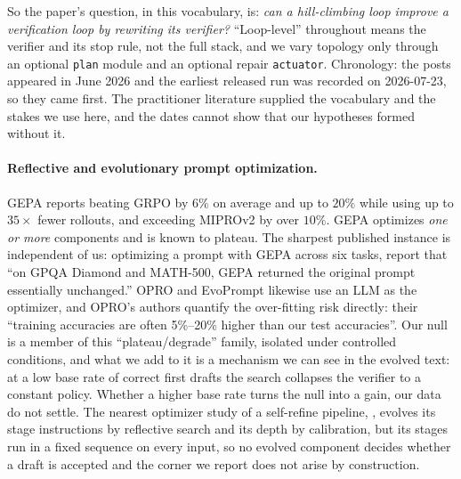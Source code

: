 \documentclass[11pt]{article}
\begin{document}
So the paper's question, in this vocabulary, is: \emph{can a hill-climbing loop improve a
verification loop by rewriting its verifier?} ``Loop-level'' throughout means the verifier
and its stop rule, not the full stack, and we vary topology only through an optional
\texttt{plan} module and an optional repair \texttt{actuator}. Chronology: the posts appeared
in June 2026 and the earliest released run was recorded on 2026-07-23, so they came first. The
practitioner literature supplied the vocabulary and the stakes we use here, and the dates cannot
show that our hypotheses formed without it.

\paragraph{Reflective and evolutionary prompt optimization.}
GEPA \citep{agrawal2025gepa} reports beating GRPO by $6\%$ on average and up to $20\%$ while
using up to $35\times$ fewer rollouts, and exceeding MIPROv2 by over $10\%$. GEPA
optimizes \emph{one or more} components and is known to plateau. The sharpest published
instance is independent of us: optimizing a prompt with GEPA across six tasks,
\citet{pappu2026multiagent} report that ``on GPQA Diamond and MATH-500, GEPA returned the
original prompt essentially unchanged.'' OPRO \citep{yang2023opro} and EvoPrompt
\citep{guo2024evoprompt} likewise use an
LLM as the optimizer, and OPRO's authors quantify the over-fitting risk directly: their
``training accuracies are often 5\%--20\% higher than our test accuracies''. Our null is a
member of this ``plateau/degrade'' family, isolated under controlled conditions, and what we add
to it is a mechanism we can see in the evolved text: at a low base rate of correct first drafts
the search collapses the verifier to a constant policy. Whether a higher base rate turns the null
into a gain, our data do not settle. The nearest optimizer study of a self-refine pipeline,
\citet{zhou2026streamlined}, evolves its stage instructions by reflective search and its depth by
calibration, but its stages run in a fixed sequence on every input, so no evolved component decides
whether a draft is accepted and the corner we report does not arise by construction.
\end{document}
